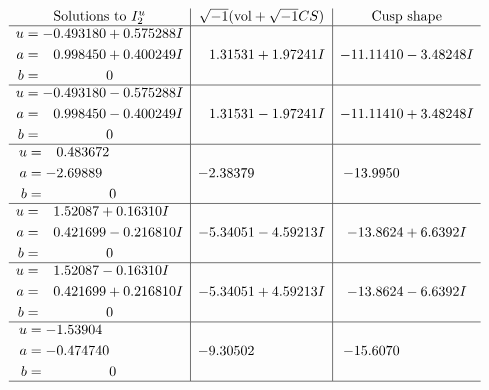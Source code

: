 \documentclass[1p]{elsarticle_modified}
\theoremstyle{definition}
\newcommand{\I}{\sqrt{-1}}
\begin{document}
$$\begin{array}{c|c|c}  
\text{Solutions to }I^u_{2}& \I (\text{vol} + \sqrt{-1}CS) & \text{Cusp shape}\\
 \hline 
\begin{aligned}
u &= -0.493180 + 0.575288 I \\
a &= \phantom{-}0.998450 + 0.400249 I \\
b &= \phantom{-0.000000 } 0\end{aligned}
 & \phantom{-}1.31531 + 1.97241 I & -11.11410 - 3.48248 I \\ \hline\begin{aligned}
u &= -0.493180 - 0.575288 I \\
a &= \phantom{-}0.998450 - 0.400249 I \\
b &= \phantom{-0.000000 } 0\end{aligned}
 & \phantom{-}1.31531 - 1.97241 I & -11.11410 + 3.48248 I \\ \hline\begin{aligned}
u &= \phantom{-}0.483672\phantom{ +0.000000I} \\
a &= -2.69889\phantom{ +0.000000I} \\
b &= \phantom{-0.000000 } 0\end{aligned}
 & -2.38379\phantom{ +0.000000I} & -13.9950\phantom{ +0.000000I} \\ \hline\begin{aligned}
u &= \phantom{-}1.52087 + 0.16310 I \\
a &= \phantom{-}0.421699 - 0.216810 I \\
b &= \phantom{-0.000000 } 0\end{aligned}
 & -5.34051 - 4.59213 I & -13.8624 + 6.6392 I \\ \hline\begin{aligned}
u &= \phantom{-}1.52087 - 0.16310 I \\
a &= \phantom{-}0.421699 + 0.216810 I \\
b &= \phantom{-0.000000 } 0\end{aligned}
 & -5.34051 + 4.59213 I & -13.8624 - 6.6392 I \\ \hline\begin{aligned}
u &= -1.53904\phantom{ +0.000000I} \\
a &= -0.474740\phantom{ +0.000000I} \\
b &= \phantom{-0.000000 } 0\end{aligned}
 & -9.30502\phantom{ +0.000000I} & -15.6070\phantom{ +0.000000I}\\
 \hline 
 \end{array}$$\newpage\newpage\renewcommand{\arraystretch}{1}
\end{document}
